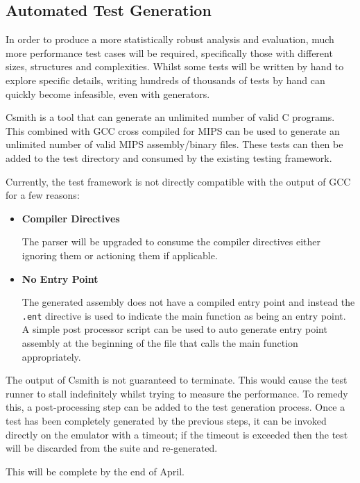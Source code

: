 \subsection{Automated Test Generation}

In order to produce a more statistically robust analysis and evaluation, much more performance test cases will be required, specifically those with different sizes, structures and complexities. Whilst some tests will be written by hand to explore specific details, writing hundreds of thousands of tests by hand can quickly become infeasible, even with generators.

Csmith \cite{csmith} is a tool that can generate an unlimited number of valid C programs. This combined with GCC \cite{gcc} cross compiled for MIPS \cite{mips-gcc} can be used to generate an unlimited number of valid MIPS assembly/binary files. These tests can then be added to the test directory and consumed by the existing testing framework.

Currently, the test framework is not directly compatible with the output of GCC for a few reasons:

\begin{itemize}
    \item \textbf{Compiler Directives}
    
    The parser will be upgraded to consume the compiler directives either ignoring them or actioning them if applicable.

    \item \textbf{No Entry Point}
    
    The generated assembly does not have a compiled entry point and instead the \texttt{.ent} directive is used to indicate the main function as being an entry point. A simple post processor script can be used to auto generate entry point assembly at the beginning of the file that calls the main function appropriately.
\end{itemize}

The output of Csmith is not guaranteed to terminate. This would cause the test runner to stall indefinitely whilst trying to measure the performance. To remedy this, a post-processing step can be added to the test generation process. Once a test has been completely generated by the previous steps, it can be invoked directly on the emulator with a timeout; if the timeout is exceeded then the test will be discarded from the suite and re-generated.

This will be complete by the end of April.